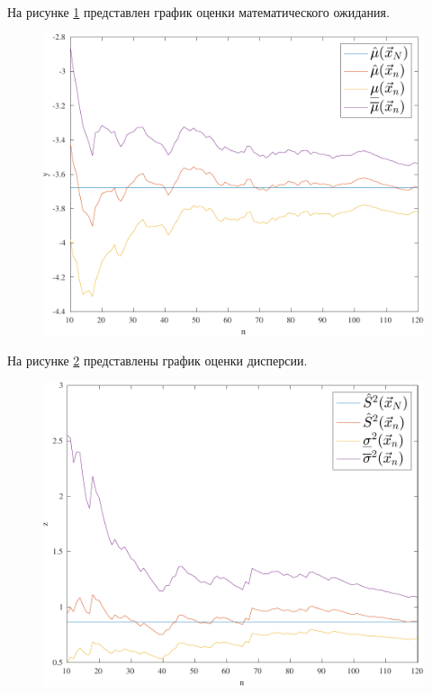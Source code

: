 На рисунке \ref{img:plot01} представлен график оценки математического ожидания.
\begin{figure}[H]
    \centering
    \includegraphics[scale=1]{plots/graph_1_fix.pdf}
    \caption{}
    \label{img:plot01}
\end{figure}

На рисунке \ref{img:plot02} представлены график оценки дисперсии.
\begin{figure}[H]
    \centering
    \includegraphics[scale=1]{plots/graph_2_fix.pdf}
    \caption{}
    \label{img:plot02}
\end{figure}

